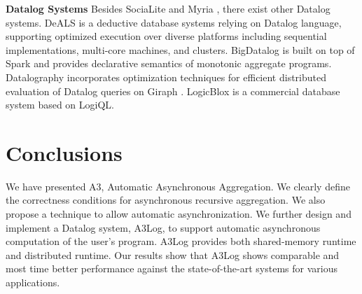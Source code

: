 \noindent\textbf{Datalog Systems}
Besides SociaLite \cite{Lam:2013:SDE:2510649.2511289,Seo:2013:DSD:2556549.2556572} and Myria \cite{Halperin:2014:DMB:2588555.2594530,Wang:2015:AFR:2824032.2824052}, there exist other Datalog systems. DeALS \cite{Shkapsky:2013:GQN:2536274.2536290,7113340} is a deductive database systems relying on Datalog language, supporting optimized execution over diverse platforms including sequential implementations, multi-core machines, and clusters. BigDatalog \cite{Shkapsky:2016:BDA:2882903.2915229} is built on top of Spark \cite{Zaharia:2010:SCC:1863103.1863113} and provides declarative semantics of monotonic aggregate programs. Datalography \cite{7840589} incorporates optimization techniques for efficient distributed evaluation of Datalog queries on Giraph \cite{giraph}. LogicBlox \cite{Aref:2015:DIL:2723372.2742796} is a commercial database system based on LogiQL.

\section{Conclusions}
\label{sec:conclusion}

We have presented A3, Automatic Asynchronous Aggregation. We clearly define the correctness conditions for asynchronous recursive aggregation.  We also propose a technique to allow automatic asynchronization. We further design and implement a Datalog system, A3Log, to support automatic asynchronous computation of the user's program. A3Log provides both shared-memory runtime and distributed runtime. Our results show that A3Log shows comparable and most time better performance against the state-of-the-art systems for various applications.

